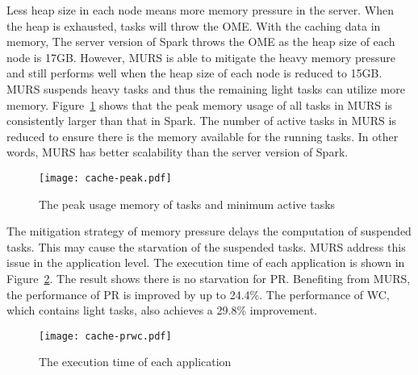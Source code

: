 Less heap size in each node means more memory pressure in the server. When the heap is exhausted, tasks will throw the OME. With the caching data in memory, The server version of Spark throws the OME as the heap size of each node is 17GB. However, MURS is able to mitigate the heavy memory pressure and still performs well when the heap size of each node is reduced to 15GB. MURS suspends heavy tasks and  thus the remaining light tasks can utilize more memory. Figure~\ref{fig:cache-peak} shows that the peak memory usage of all tasks in MURS is consistently larger than that in Spark. The number of active tasks in MURS is reduced to ensure there is the memory available for the running tasks. In other words, MURS has better scalability than the server version of Spark.

\begin{figure}[!t]
\centering
\texttt{[image: cache-peak.pdf]}
\vspace{-2mm}
\caption{The peak usage memory of tasks and minimum active tasks}
\vspace{-2mm}
\label{fig:cache-peak}
\end{figure}


The mitigation strategy of memory pressure delays the computation of suspended tasks. This may cause the starvation of the suspended tasks. MURS address this issue in the application level.
The execution time of each application is shown in Figure~\ref{fig:cache-prwc}. The result shows there is no starvation for PR. Benefiting from MURS, the performance of PR is improved by up to 24.4\%. The performance of WC, which contains light tasks, also achieves a 29.8\% improvement. 

\begin{figure}[!t]
\centering
\texttt{[image: cache-prwc.pdf]}
\vspace{-2mm}
\caption{The execution time of each application}
\vspace{-6mm}
\label{fig:cache-prwc}
\end{figure}

